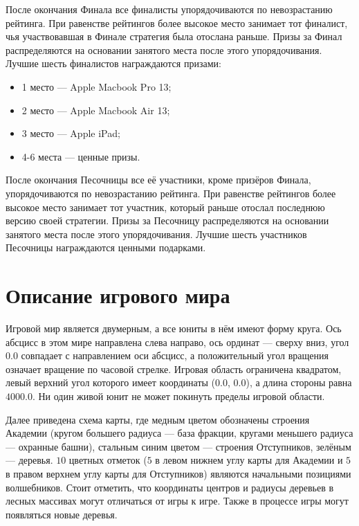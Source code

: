 После окончания Финала все финалисты упорядочиваются по невозрастанию рейтинга. При равенстве рейтингов более высокое место занимает тот
финалист, чья участвовавшая в Финале стратегия была отослана раньше. Призы за Финал распределяются на основании занятого места после этого
упорядочивания. Лучшие шесть финалистов награждаются призами:
\begin{itemize}
\item 1 место --- Apple Macbook Pro 13\textquotedbl;
\item 2 место --- Apple Macbook Air 13\textquotedbl;
\item 3 место --- Apple iPad;
\item 4-6 места --- ценные призы.
\end{itemize}

После окончания Песочницы все её участники, кроме призёров Финала, упорядочиваются по невозрастанию рейтинга. При равенстве рейтингов более
высокое место занимает тот участник, который раньше отослал последнюю версию своей стратегии. Призы за Песочницу распределяются на основании
занятого места после этого упорядочивания. Лучшие шесть участников Песочницы награждаются ценными подарками.

\section{Описание игрового мира}

Игровой мир является двумерным, а все юниты в нём имеют форму круга. Ось абсцисс в этом мире направлена слева направо, ось ординат ---
сверху вниз, угол $0.0$ совпадает с направлением оси абсцисс, а положительный угол вращения означает вращение по часовой стрелке. Игровая
область ограничена квадратом, левый верхний угол которого имеет координаты ($0.0$, $0.0$), а длина стороны равна $4000.0$. Ни один живой
юнит не может покинуть пределы игровой области.

\newpage
Далее приведена схема карты, где медным цветом обозначены строения Академии (кругом большего радиуса --- база фракции, кругами меньшего
радиуса --- охранные башни), стальным синим цветом --- строения Отступников, зелёным --- деревья. $10$ цветных отметок ($5$ в левом нижнем
углу карты для Академии и $5$ в правом верхнем углу карты для Отступников) являются начальными позициями волшебников. Стоит отметить, что
координаты центров и радиусы деревьев в лесных массивах могут отличаться от игры к игре. Также в процессе игры могут появляться новые
деревья.

